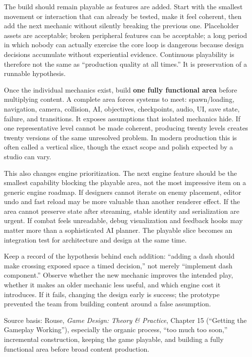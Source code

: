 The build should remain playable as features are added. Start with the smallest movement or interaction that can already be tested, make it feel coherent, then add the next mechanic without silently breaking the previous one. Placeholder assets are acceptable; broken peripheral features can be acceptable; a long period in which nobody can actually exercise the core loop is dangerous because design decisions accumulate without experiential evidence. Continuous playability is therefore not the same as ``production quality at all times.'' It is preservation of a runnable hypothesis.

Once the individual mechanics exist, build \textbf{one fully functional area} before multiplying content. A complete area forces systems to meet: spawn/loading, navigation, camera, collision, AI, objectives, checkpoints, audio, UI, save state, failure, and transitions. It exposes assumptions that isolated mechanics hide. If one representative level cannot be made coherent, producing twenty levels creates twenty versions of the same unresolved problem. In modern production this is often called a vertical slice, though the exact scope and polish expected by a studio can vary.

This also changes engine prioritization. The next engine feature should be the smallest capability blocking the playable area, not the most impressive item on a generic engine roadmap. If designers cannot iterate on enemy placement, editor undo and fast reload may be more valuable than another renderer effect. If the area cannot preserve state after streaming, stable identity and serialization are urgent. If combat feels unreadable, debug visualization and feedback hooks may matter more than a sophisticated AI planner. The playable slice becomes an integration test for architecture and design at the same time.

Keep a record of the hypothesis behind each addition: ``adding a dash should make crossing exposed space a timed decision,'' not merely ``implement dash component.'' Observe whether the new mechanic improves the intended play, whether it makes an older mechanic less useful, and which engine cost it introduces. If it fails, changing the design early is success; the prototype prevented the team from building content around a false assumption.

Source basis: Rouse, \emph{Game Design: Theory \& Practice}, Chapter 15 (``Getting the Gameplay Working''), especially the organic process, ``too much too soon,'' incremental construction, keeping the game playable, and building a fully functional area before broad content production.

